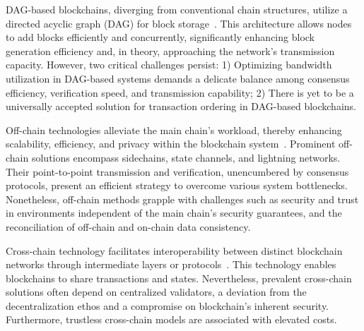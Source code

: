 \documentclass[conference]{IEEEtran}
\begin{document}
DAG-based blockchains, diverging from conventional chain structures, utilize a directed acyclic graph (DAG) for block storage~\cite{conflux,PHANTOM,silvano2020iota,tairi20212}. This architecture allows nodes to add blocks efficiently and concurrently, significantly enhancing block generation efficiency and, in theory, approaching the network's transmission capacity. However, two critical challenges persist: 1) Optimizing bandwidth utilization in DAG-based systems demands a delicate balance among consensus efficiency, verification speed, and transmission capability; 2) There is yet to be a universally accepted solution for transaction ordering in DAG-based blockchains.


Off-chain technologies alleviate the main chain's workload, thereby enhancing scalability, efficiency, and privacy within the blockchain system~\cite{LN,Plasma,OptimisticRollup,gavzi2019proof}. Prominent off-chain solutions encompass sidechains, state channels, and lightning networks. Their point-to-point transmission and verification, unencumbered by consensus protocols, present an efficient strategy to overcome various system bottlenecks. Nonetheless, off-chain methods grapple with challenges such as security and trust in environments independent of the main chain's security guarantees, and the reconciliation of off-chain and on-chain data consistency.


Cross-chain technology facilitates interoperability between distinct blockchain networks through intermediate layers or protocols~\cite{dilley2016strong,wood2016polkadot,thomas2015protocol,garoffolo2020zendoo,neu2021ebb,tian2021enabling,sober2021voting}. This technology enables blockchains to share transactions and states. Nevertheless, prevalent cross-chain solutions often depend on centralized validators, a deviation from the decentralization ethos and a compromise on blockchain's inherent security. Furthermore, trustless cross-chain models are associated with elevated costs.
\end{document}
